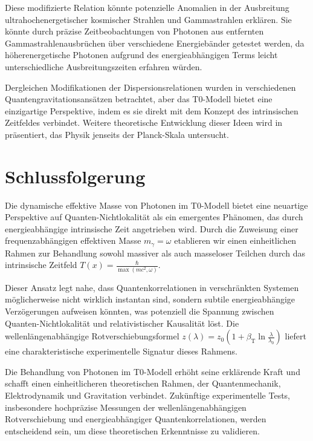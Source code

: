 \documentclass[12pt,a4paper]{article}
\newcommand{\Tfield}{T(x)}
\newcommand{\betaT}{\beta_{\text{T}}}
\begin{document}
	Diese modifizierte Relation könnte potenzielle Anomalien in der Ausbreitung ultrahochenergetischer kosmischer Strahlen und Gammastrahlen erklären. Sie könnte durch präzise Zeitbeobachtungen von Photonen aus entfernten Gammastrahlenausbrüchen über verschiedene Energiebänder getestet werden, da höherenergetische Photonen aufgrund des energieabhängigen Terms leicht unterschiedliche Ausbreitungszeiten erfahren würden.
	
	Dergleichen Modifikationen der Dispersionsrelationen wurden in verschiedenen Quantengravitationsansätzen betrachtet, aber das T0-Modell bietet eine einzigartige Perspektive, indem es sie direkt mit dem Konzept des intrinsischen Zeitfeldes verbindet. Weitere theoretische Entwicklung dieser Ideen wird in \cite{pascher_planck_2025} präsentiert, das Physik jenseits der Planck-Skala untersucht.
	
	\section{Schlussfolgerung}
	Die dynamische effektive Masse von Photonen im T0-Modell bietet eine neuartige Perspektive auf Quanten-Nichtlokalität als ein emergentes Phänomen, das durch energieabhängige intrinsische Zeit angetrieben wird. Durch die Zuweisung einer frequenzabhängigen effektiven Masse \(m_\gamma = \omega\) etablieren wir einen einheitlichen Rahmen zur Behandlung sowohl massiver als auch masseloser Teilchen durch das intrinsische Zeitfeld \(\Tfield = \frac{\hbar}{\max(m c^2, \omega)}\).
	
	Dieser Ansatz legt nahe, dass Quantenkorrelationen in verschränkten Systemen möglicherweise nicht wirklich instantan sind, sondern subtile energieabhängige Verzögerungen aufweisen könnten, was potenziell die Spannung zwischen Quanten-Nichtlokalität und relativistischer Kausalität löst. Die wellenlängenabhängige Rotverschiebungsformel \(z(\lambda) = z_0 \left(1 + \betaT \ln\frac{\lambda}{\lambda_0}\right)\) liefert eine charakteristische experimentelle Signatur dieses Rahmens.
	
	Die Behandlung von Photonen im T0-Modell erhöht seine erklärende Kraft und schafft einen einheitlicheren theoretischen Rahmen, der Quantenmechanik, Elektrodynamik und Gravitation verbindet. Zukünftige experimentelle Tests, insbesondere hochpräzise Messungen der wellenlängenabhängigen Rotverschiebung und energieabhängiger Quantenkorrelationen, werden entscheidend sein, um diese theoretischen Erkenntnisse zu validieren.
	
\end{document}
